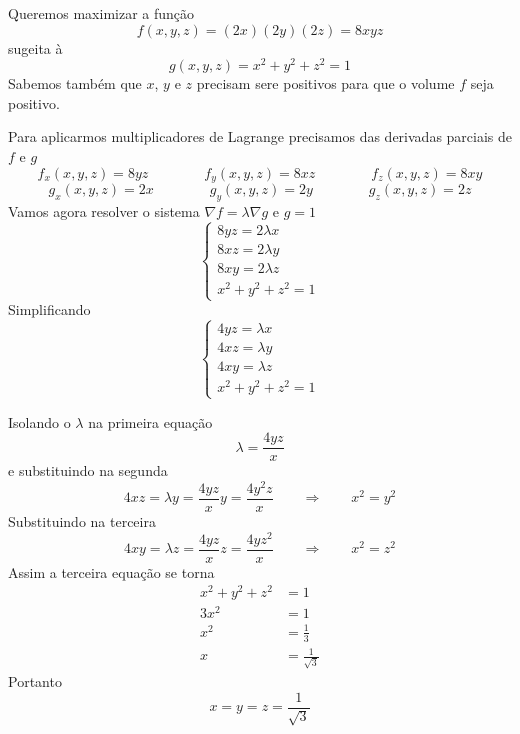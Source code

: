 \documentclass[a4paper,12pt,fleqn]{article}
\begin{document}
\begin{answer}
  Queremos maximizar a função
  \[
    f(x, y, z) = (2x)(2y)(2z) = 8xyz
  \]
  sugeita à
  \[
    g(x, y, z) = x^2 + y^2 + z^2 = 1
  \]
  Sabemos também que $x$, $y$ e $z$ precisam sere positivos para que o volume $f$
  seja positivo.

  Para aplicarmos multiplicadores de Lagrange precisamos das derivadas
  parciais de $f$ e $g$
  \[
    f_x(x, y, z) = 8yz \qquad\qquad
    f_y(x, y, z) = 8xz \qquad\qquad
    f_z(x, y, z) = 8xy
  \]
  \[
    g_x(x, y, z) = 2x \qquad\qquad
    g_y(x, y, z) = 2y \qquad\qquad
    g_z(x, y, z) = 2z
  \]
  Vamos agora resolver o sistema \(\nabla f = \lambda\nabla g\) e \(g=1\)
  \[
    \begin{cases}
      8yz = 2\lambda x \\
      8xz = 2\lambda y \\
      8xy = 2\lambda z \\
      x^2 + y^2 + z^2 = 1
    \end{cases}
  \]
  Simplificando
  \[
    \begin{cases}
      4yz = \lambda x \\
      4xz = \lambda y \\
      4xy = \lambda z \\
      x^2 + y^2 + z^2 = 1
    \end{cases}
  \]

  Isolando o $\lambda$ na primeira equação
  \[
    \lambda = \frac{4yz}{x}
  \]
  e substituindo na segunda
  \[
    4xz
    = \lambda y
    = \frac{4yz}{x} y
    = \frac{4y^2z}{x}
    \qquad\Rightarrow\qquad
    x^2 = y^2
  \]
  Substituindo na terceira
  \[
    4xy = \lambda z
    = \frac{4yz}{x}z
    = \frac{4yz^2}{x}
    \qquad\Rightarrow\qquad
    x^2 = z^2
  \]
  Assim a terceira equação se torna
  \begin{align*}
    x^2 + y^2 + z^2 & = 1                      \\[2mm]
    3x^2            & = 1                      \\[2mm]
    x^2             & = \frac{1}{3}            \\[2mm]
    x               & = \frac{1}{\sqrt{3}}
  \end{align*}
  Portanto
  \[
    x = y = z = \frac{1}{\sqrt{3}}
  \]
\end{answer}

\end{document}
